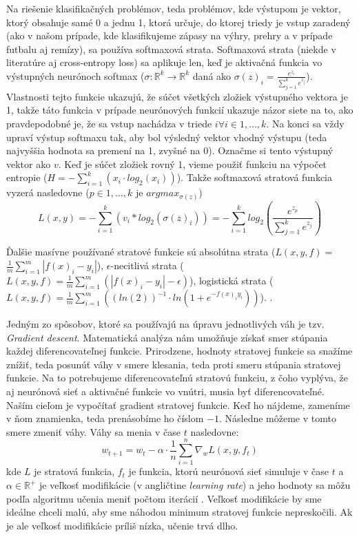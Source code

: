 Na riešenie klasifikačných problémov, teda problémov, kde výstupom je vektor, ktorý obsahuje samé 0 a jednu 1, ktorá určuje, do ktorej triedy je vstup zaradený (ako v našom prípade, kde klasifikujeme zápasy na výhry, prehry a v prípade futbalu aj remízy), sa používa softmaxová strata.
Softmaxová strata (niekde v literatúre aj cross-entropy loss) sa aplikuje len, keď je aktivačná funkcia vo výstupných neurónoch softmax ($\sigma: \mathbb{R}^k \to \mathbb{R}^k$ daná ako $\sigma(z)_i = \frac{e^{z_i}}{\sum_{j=1}^k e^{z_j}}$).
Vlastnosti tejto funkcie ukazujú, že súčet všetkých zložiek výstupného vektora je 1, takže táto funkcia v prípade neurónových funkcií ukazuje názor siete na to, ako pravdepodobné je, že sa vstup nachádza v triede $i \forall i \in {1,\dots , k}$.
Na konci sa vždy upraví výstup softmaxu tak, aby bol výsledný vektor vhodný výstupu (teda najvyššia hodnota sa premení na 1, zvyšné na 0). Označme si tento výstupný vektor ako $v$.
Keď je súčet zložiek rovný 1, vieme použiť funkciu na výpočet entropie ($ H = -\sum_{i=1}^k \left(x_i \cdot log_2(x_i)\right) $).
Takže softmaxová stratová funkcia vyzerá nasledovne ($p \in {1,\dots ,k}$ je $argmax_{\sigma(z)}$)
$$L(x,y) = -\sum_{i=1}^k \left(v_i*log_2(\sigma(z)_i)\right) = -\sum_{i=1}^k log_2\left(\frac{e^{z_p}}{\sum_{j=1}^k e^{z_{j}}}\right)  $$

Ďalšie masívne používané stratové funkcie sú 
absolútna strata ($L(x,y,f) = $ $\frac{1}{m}\sum_{i=1}^m \left|f(x)_i - y_i\right|$), 
$\epsilon$-necitlivá strata ($L(x,y,f) = \frac{1}{m}\sum_{i=1}^m \left(\left|f(x)_i - y_i\right| - \epsilon\right)$), 
logistická strata ($L(x,y,f) = \frac{1}{m} \sum_{i=1}^m  \left((ln(2))^{-1}\cdot ln(1+e^{-f(x)_iy_i})\right) $).
\citep{loss}.

Jedným zo spôsobov, ktoré sa používajú na úpravu jednotlivých váh je tzv. \textit{Gradient descent}.
Matematická analýza nám umožňuje získať smer stúpania každej diferencovateľnej funkcie.
Prirodzene, hodnoty stratovej funkcie sa snažíme znížiť, teda posunúť váhy v smere klesania, teda proti smeru stúpania stratovej funkcie.
Na to potrebujeme diferencovateľnú stratovú funkciu, z čoho vyplýva, že aj neurónová sieť a aktivačné funkcie vo vnútri, musia byť diferencovateľné.
Naším cieľom je vypočítať gradient stratovej funkcie.
Keď ho nájdeme, zameníme v ňom znamienka, teda prenásobíme ho číslom $-1$.
Následne môžeme v tomto smere zmeniť váhy.
Váhy sa menia v čase $t$ nasledovne: 
$$w_{t+1} = w_t - \alpha \cdot \frac{1}{n} \sum_{i=1}^n \nabla_w L(x,y,f_t)$$
kde $L$ je stratová funkcia, $f_t$ je funkcia, ktorú neurónová sieť simuluje v čase $t$  a $\alpha \in \mathbb{R}^+$ je veľkosť modifikácie (v angličtine \textit{learning rate}) a jeho hodnoty sa môžu podľa algoritmu učenia meniť počtom iterácií \citep{nn:gd}. Veľkosť modifikácie by sme ideálne chceli malú, aby sme náhodou minimum stratovej funkcie nepreskočili. Ak je ale veľkosť modifikácie príliš nízka, učenie trvá dlho.

